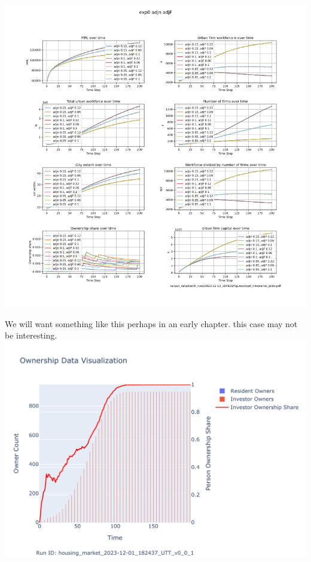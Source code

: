\documentclass{article}
\begin{document}
\includegraphics[scale=.55]{fig/Analysis/F-n-adjustment-speed.png}



We will want something like this perhaps in an early chapter. this case may not be interesting.
\includegraphics[scale=.95]{fig/Analysis/Ownership_Data_1.pdf}
\end{document}
